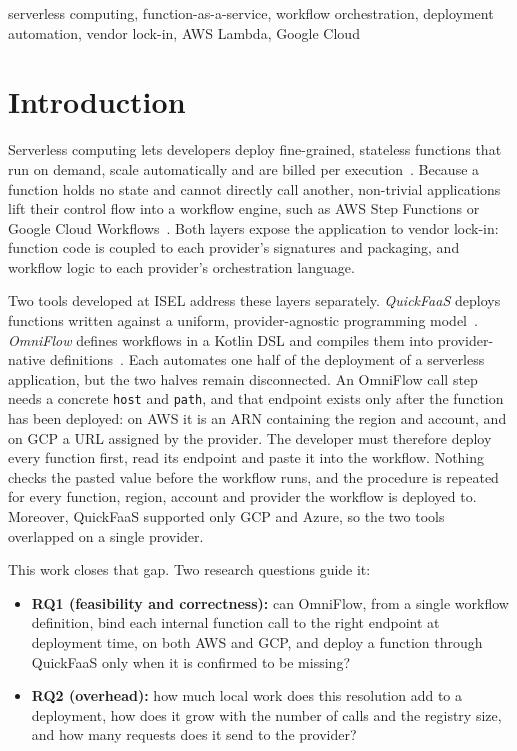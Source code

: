 \documentclass[conference]{IEEEtran}
\begin{document}
\begin{IEEEkeywords}
serverless computing, function-as-a-service, workflow orchestration, deployment automation,
vendor lock-in, AWS Lambda, Google Cloud
\end{IEEEkeywords}

\section{Introduction}
\label{sec:intro}

Serverless computing lets developers deploy fine-grained, stateless functions that run on demand,
scale automatically and are billed per execution~\cite{serverlessComputing,jonas2019cloudProgramming}.
Because a function holds no state and cannot directly call another, non-trivial applications lift
their control flow into a workflow engine, such as AWS Step Functions or Google Cloud
Workflows~\cite{aws_stepfunctions_concepts,gcp_workflows_overview}. Both layers expose the
application to vendor lock-in: function code is coupled to each provider's signatures and
packaging, and workflow logic to each provider's orchestration language.

Two tools developed at ISEL address these layers separately. \emph{QuickFaaS} deploys functions
written against a uniform, provider-agnostic programming model~\cite{rodrigues2022quickfaas}.
\emph{OmniFlow} defines workflows in a Kotlin DSL and compiles them into provider-native
definitions~\cite{costa2023omniflow,silva2025advanced}. Each automates one half of the deployment
of a serverless application, but the two halves remain disconnected. An OmniFlow call step needs a
concrete \texttt{host} and \texttt{path}, and that endpoint exists only after the function has
been deployed: on AWS it is an ARN containing the region and account, and on GCP a URL assigned by
the provider. The developer must therefore deploy every function first, read its endpoint and
paste it into the workflow. Nothing checks the pasted value before the workflow runs, and the
procedure is repeated for every function, region, account and provider the workflow is deployed
to. Moreover, QuickFaaS supported only GCP and Azure, so the two tools overlapped on a single
provider.

This work closes that gap. Two research questions guide it:
\begin{itemize}
  \item \textbf{RQ1 (feasibility and correctness):} can OmniFlow, from a single workflow
  definition, bind each internal function call to the right endpoint at deployment time, on both
  AWS and GCP, and deploy a function through QuickFaaS only when it is confirmed to be missing?
  \item \textbf{RQ2 (overhead):} how much local work does this resolution add to a deployment,
  how does it grow with the number of calls and the registry size, and how many requests does it
  send to the provider?
\end{itemize}
\end{document}
